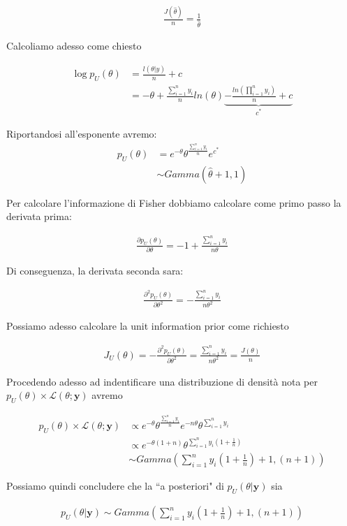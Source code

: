 \begin{align*}
\frac{J(\hat{\theta})}{n} = \frac{1}{\hat{\theta}}
\end{align*}

Calcoliamo adesso come chiesto 

\begin{align*}
\log p_U(\theta) &= \frac{l(\theta|y)}{n}+c\\
 &= -\theta + \frac{\sum_{i=1}^n y_i}{n} ln(\theta) \underbrace{ -\frac{ln(\prod_{i=1}^n y_i)}{n} + c }_\text{$c^*$}
\end{align*}

Riportandosi all'esponente avremo:
\begin{align*}
p_U(\theta) &= e^{-\theta}\theta^{\frac{\sum_{i=1}^n y_i}{n}}e^{c^*}\\
&\sim Gamma(\hat{\theta}+1,1)
\end{align*}

Per calcolare l'informazione di Fisher dobbiamo calcolare come primo passo la derivata prima:

\begin{align*}
\frac{\partial p_U(\theta)}{\partial\theta} = -1 + \frac{\sum_{i=1}^n y_i}{n\theta}
\end{align*}

Di conseguenza, la derivata seconda sara:

\begin{align*}
\frac{\partial^2 p_U(\theta)}{\partial\theta^2} = - \frac{\sum_{i=1}^n y_i}{n\theta^2}
\end{align*}

Possiamo adesso calcolare la unit information prior come richiesto

\begin{align*}
J_U(\theta)= - \frac{\partial^2 p_U(\theta)}{\partial\theta^2} = \frac{\sum_{i=1}^n y_i}{n\theta^2} = \frac{J(\theta)}{n}
\end{align*}

Procedendo adesso ad indentificare una distribuzione di densità nota per $  p_U(\theta) \times \mathcal{L}(\theta;\textbf{y}) $ avremo 

\begin{align*}
p_U(\theta) \times \mathcal{L}(\theta;\textbf{y}) &\propto e^{-\theta} \theta  ^ {\frac{\sum_{i=1}^n y_i}{n}} e^{-n\theta}\theta^{\sum_{i=1}^n y_i}\\
&\propto e^{-\theta(1+n)}\theta^{\sum_{i=1}^n y_i (1+\frac{1}{n})}\\
&\sim Gamma\left(\sum_{i=1}^n y_i\left(1 + \frac{1}{n}\right) + 1, (n+1)\right)
\end{align*}

Possiamo quindi concludere che la ``a posteriori" di $p_U(\theta|\textbf{y})$ sia

\begin{align*}
p_U(\theta|\textbf{y}) \sim Gamma\left(\sum_{i=1}^n y_i\left(1 + \frac{1}{n}\right) + 1, (n+1)\right)
\end{align*}
